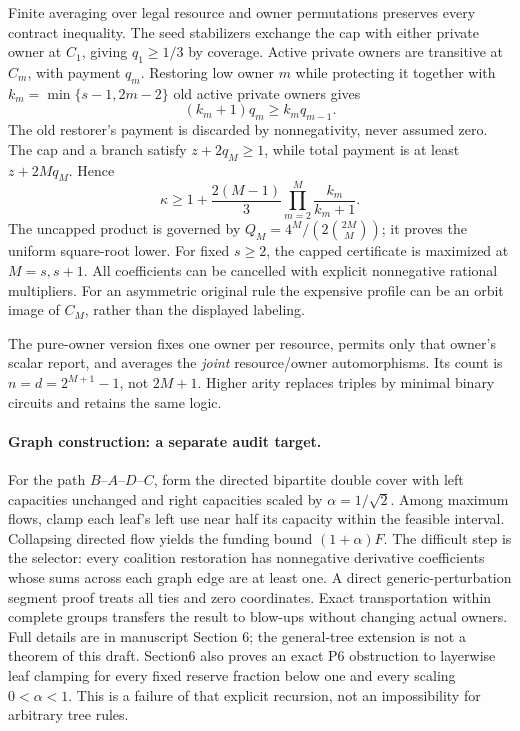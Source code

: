\documentclass[11pt]{article}
\begin{document}
Finite averaging over legal resource and owner permutations preserves every
contract inequality. The seed stabilizers exchange the cap with either private
owner at $C_1$, giving $q_1\ge1/3$ by coverage. Active private owners are
transitive at $C_m$, with payment $q_m$. Restoring low owner $m$ while
protecting it together with $k_m=\min\{s-1,2m-2\}$ old active private owners
gives
\[
 (k_m+1)q_m\ge k_m q_{m-1}.
\]
The old restorer's payment is discarded by nonnegativity, never assumed zero.
The cap and a branch satisfy $z+2q_M\ge1$, while total payment is at least
$z+2Mq_M$. Hence
\[
 \kappa\ge1+\frac{2(M-1)}3
       \prod_{m=2}^M\frac{k_m}{k_m+1}.
\]
The uncapped product is governed by
$Q_M=4^M/(2\binom{2M}{M})$; it proves the uniform square-root lower.
For fixed $s\ge2$, the capped certificate is maximized at $M=s,s+1$.
All coefficients can be cancelled with explicit nonnegative rational
multipliers. For an asymmetric original rule the expensive profile can be an
orbit image of $C_M$, rather than the displayed labeling.

The pure-owner version fixes one owner per resource, permits only that owner's
scalar report, and averages the \emph{joint} resource/owner automorphisms.
Its count is $n=d=2^{M+1}-1$, not $2M+1$. Higher arity replaces triples by
minimal binary circuits and retains the same logic.

\paragraph{Graph construction: a separate audit target.}
For the path $B$--$A$--$D$--$C$, form the directed bipartite double cover with
left capacities unchanged and right capacities scaled by $\alpha=1/\sqrt2$.
Among maximum flows, clamp each leaf's left use near half its capacity within
the feasible interval. Collapsing directed flow yields the funding bound
$(1+\alpha)F$. The difficult step is the selector: every coalition restoration
has nonnegative derivative coefficients whose sums across each graph edge
are at least one. A direct generic-perturbation segment proof treats all ties
and zero coordinates. Exact transportation within complete groups transfers
the result to blow-ups without changing actual owners. Full details are in
manuscript Section 6; the general-tree extension is not a theorem of this draft. Section6 also
proves an exact P6 obstruction to layerwise leaf clamping for every fixed
reserve fraction below one and every scaling $0<\alpha<1$. This is a failure
of that explicit recursion, not an impossibility for arbitrary tree rules.
\end{document}
